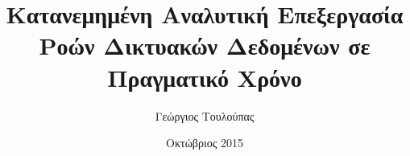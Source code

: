 \documentclass[diploma]{softlab-thesis}
\begin{document}

\frontmatter

\title{Κατανεμημένη Αναλυτική Επεξεργασία Ροών Δικτυακών Δεδομένων σε Πραγματικό Χρόνο}
\author{Γεώργιος Τουλούπας}
\date{Οκτώβριος 2015}



\maketitle















\renewcommand{\contentsname}{Contents}
\renewcommand{\listtablename}{List of Tables}
\renewcommand{\listfigurename}{List of Figures}

\tableofcontents
\listoftables
\listoffigures



\mainmatter

\renewcommand{\chaptername}{Chapter}
\renewcommand{\figurename}{Figure}
\renewcommand{\tablename}{Table}
\renewcommand{\pagesname}{Pages}
\renewcommand{\refname}{References}
\renewcommand{\bibname}{Bibliography}
\renewcommand{\indexname}{Index}
\renewcommand{\appendixname}{Appendix}












\end{document}
